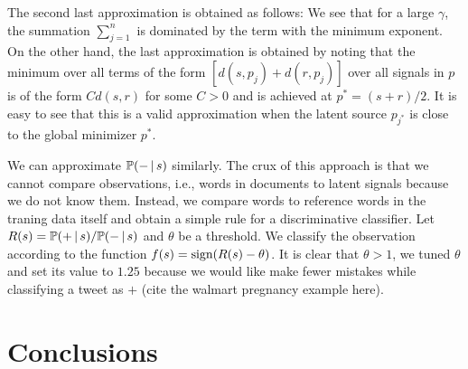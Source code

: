 \documentclass[11pt, letterpaper, conference, final, twocolumn]{ieeeconf}
\begin{document}
The second last approximation is obtained as follows: We see that for a large $\gamma$, the summation $\sum_{j=1}^n$ is dominated by the term with the minimum exponent. On the other hand, the last approximation is obtained by noting that the minimum over all terms of the form $[ d(s, p_j) + d(r, p_j)]$ over all signals in $p$ is of the form $C d(s,r)$ for some $C > 0$ and is achieved at $p^* = (s+r)/2$. It is easy to see that this is a valid approximation when the latent source $p_{j^*}$ is close to the global minimizer $p^*$.

We can approximate $\mathbb{P}(- \, \vert \, s)$ similarly. The crux of this approach is that we cannot compare observations, i.e., words in documents to latent signals because we do not know them. Instead, we compare words to reference words in the traning data itself and obtain a simple rule for a discriminative classifier. Let $R(s) = \mathbb{P}(+ \, \vert \, s)/\mathbb{P}(- \, \vert \, s)$ and $\theta$ be a threshold. We classify the observation according to the function $f(s) = \textrm{sign}(R(s) - \theta)$. It is clear that $\theta > 1$, we tuned $\theta$ and set its value to $1.25$ because we would like make fewer mistakes while classifying a tweet as $+$ (cite the walmart pregnancy example here).

\section{Conclusions}
\label{sec:conclusions}



\end{document}
